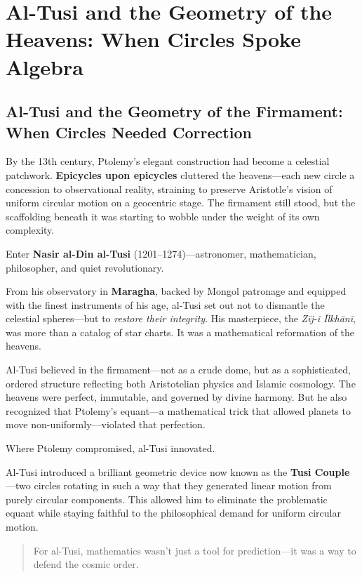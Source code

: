 \section{Al-Tusi and the Geometry of the Heavens: When Circles Spoke Algebra}

\subsection{Al-Tusi and the Geometry of the Firmament: When Circles Needed Correction}

By the 13th century, Ptolemy’s elegant construction had become a celestial patchwork.  
\textbf{Epicycles upon epicycles} cluttered the heavens—each new circle a concession to observational reality, straining to preserve Aristotle’s vision of uniform circular motion on a geocentric stage. The firmament still stood, but the scaffolding beneath it was starting to wobble under the weight of its own complexity.

Enter \textbf{Nasir al-Din al-Tusi} (1201–1274)—astronomer, mathematician, philosopher, and quiet revolutionary.

From his observatory in \textbf{Maragha}, backed by Mongol patronage and equipped with the finest instruments of his age, al-Tusi set out not to dismantle the celestial spheres—but to \textit{restore their integrity}. His masterpiece, the \textit{Zīj-i Īlkhānī}, was more than a catalog of star charts. It was a mathematical reformation of the heavens.

Al-Tusi believed in the firmament—not as a crude dome, but as a sophisticated, ordered structure reflecting both Aristotelian physics and Islamic cosmology. The heavens were perfect, immutable, and governed by divine harmony. But he also recognized that Ptolemy’s equant—a mathematical trick that allowed planets to move non-uniformly—violated that perfection.

Where Ptolemy compromised, al-Tusi innovated.

Al-Tusi introduced a brilliant geometric device now known as the \textbf{Tusi Couple}—two circles rotating in such a way that they generated linear motion from purely circular components. This allowed him to eliminate the problematic equant while staying faithful to the philosophical demand for uniform circular motion.

\begin{quote}
For al-Tusi, mathematics wasn’t just a tool for prediction—it was a way to defend the cosmic order.
\end{quote}

